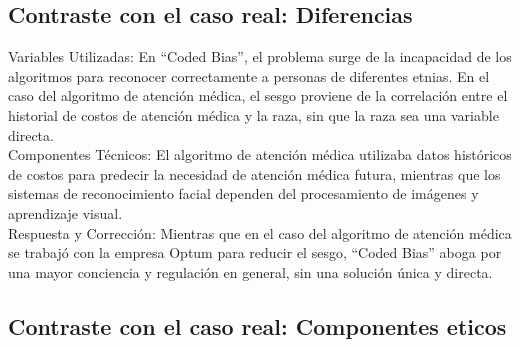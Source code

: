 \documentclass[conference]{IEEEtran}
\begin{document}
\subsection{Contraste con el caso real: Diferencias}

Variables Utilizadas: En “Coded Bias”, el problema surge de la incapacidad de los algoritmos para reconocer correctamente a personas de diferentes etnias. En el caso del algoritmo de atención médica, el sesgo proviene de la correlación entre el historial de costos de atención médica y la raza, sin que la raza sea una variable directa.\\[12pt]
Componentes Técnicos: El algoritmo de atención médica utilizaba datos históricos de costos para predecir la necesidad de atención médica futura, mientras que los sistemas de reconocimiento facial dependen del procesamiento de imágenes y aprendizaje visual.\\[12pt]
Respuesta y Corrección: Mientras que en el caso del algoritmo de atención médica se trabajó con la empresa Optum para reducir el sesgo, “Coded Bias” aboga por una mayor conciencia y regulación en general, sin una solución única y directa.


\subsection{Contraste con el caso real: Componentes eticos}
\end{document}
